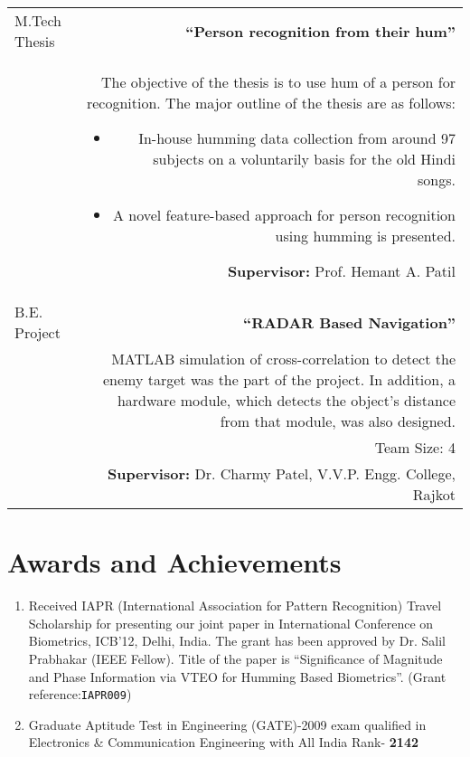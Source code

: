 \documentclass[10pt]{article}
\begin{document}
\begin{tabular}{L!{\VRule}R}
M.Tech Thesis&\textbf{``Person recognition from their hum''}\\&The objective of the thesis is to use hum of a person for recognition. The major outline of the thesis are as follows: 
\vspace{-0.3cm}
\begin{itemize}
	\setlength\itemsep{0em}
	\item In-house humming data collection from around 97 subjects on a voluntarily basis for the old Hindi songs. 
	\item A novel feature-based approach for person recognition using humming is presented.
\end{itemize} 
\textbf{Supervisor:} Prof. Hemant A. Patil\vspace{0.5cm}\\
B.E. Project&\textbf{``RADAR Based Navigation''}\\&MATLAB simulation of cross-correlation to detect the enemy target was the part of the project. In addition, a hardware module, which detects the object's  distance from that module, was also designed.\\& Team Size: 4\\&\vspace{0.01cm} \textbf{Supervisor:} Dr. Charmy Patel, V.V.P. Engg. College, Rajkot
\end{tabular}
\vspace*{0.3cm}

\section*{Awards and Achievements}
\begin{enumerate}
				\setlength\itemsep{0.15em}
\item Received IAPR (International Association for Pattern Recognition) Travel Scholarship for presenting our joint paper in International Conference on Biometrics, ICB'12, Delhi, India. The grant has been approved by Dr. Salil Prabhakar (IEEE Fellow).  Title of the paper is ``Significance of Magnitude and Phase Information via VTEO for Humming Based Biometrics''. (Grant reference:\verb|IAPR009|)
\item Graduate Aptitude Test in Engineering (GATE)-2009 exam qualified in Electronics \& Communication Engineering with All India Rank- \textbf{2142} 
\end{enumerate}
\end{document}
